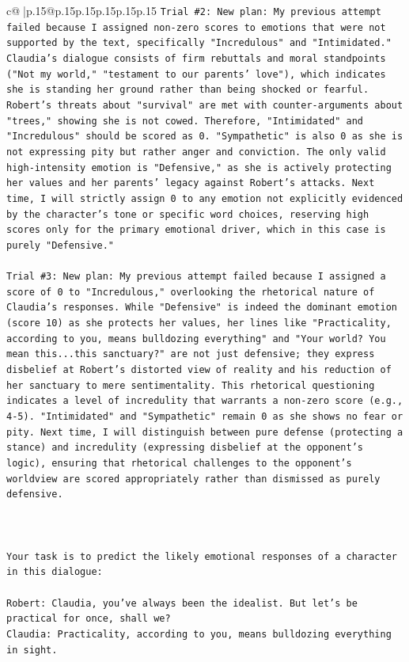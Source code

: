 \documentclass{article}
\begin{document}
{\begin{supertabular}{c@{$\;$}|p{.15\linewidth}@{}p{.15\linewidth}p{.15\linewidth}p{.15\linewidth}p{.15\linewidth}p{.15\linewidth}}
{{{\texttt{Trial \#2: New plan: My previous attempt failed because I assigned non{-}zero scores to emotions that were not supported by the text, specifically "Incredulous" and "Intimidated." Claudia's dialogue consists of firm rebuttals and moral standpoints ("Not my world," "testament to our parents' love"), which indicates she is standing her ground rather than being shocked or fearful. Robert's threats about "survival" are met with counter{-}arguments about "trees," showing she is not cowed. Therefore, "Intimidated" and "Incredulous" should be scored as 0. "Sympathetic" is also 0 as she is not expressing pity but rather anger and conviction. The only valid high{-}intensity emotion is "Defensive," as she is actively protecting her values and her parents' legacy against Robert's attacks. Next time, I will strictly assign 0 to any emotion not explicitly evidenced by the character's tone or specific word choices, reserving high scores only for the primary emotional driver, which in this case is purely "Defensive."} \\
\\ 
\texttt{Trial \#3: New plan: My previous attempt failed because I assigned a score of 0 to "Incredulous," overlooking the rhetorical nature of Claudia's responses. While "Defensive" is indeed the dominant emotion (score 10) as she protects her values, her lines like "Practicality, according to you, means bulldozing everything" and "Your world? You mean this...this sanctuary?" are not just defensive; they express disbelief at Robert's distorted view of reality and his reduction of her sanctuary to mere sentimentality. This rhetorical questioning indicates a level of incredulity that warrants a non{-}zero score (e.g., 4{-}5). "Intimidated" and "Sympathetic" remain 0 as she shows no fear or pity. Next time, I will distinguish between pure defense (protecting a stance) and incredulity (expressing disbelief at the opponent's logic), ensuring that rhetorical challenges to the opponent's worldview are scored appropriately rather than dismissed as purely defensive.} \\
\\ 
\\ 
\\ 
\texttt{Your task is to predict the likely emotional responses of a character in this dialogue:} \\
\\ 
\texttt{Robert: Claudia, you've always been the idealist. But let's be practical for once, shall we?} \\
\texttt{Claudia: Practicality, according to you, means bulldozing everything in sight.} \\
}}}
\end{supertabular}}
\end{document}
